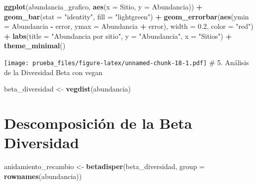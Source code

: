 \documentclass[
]{article}
\newenvironment{Shaded}{\begin{snugshade}}{\end{snugshade}}
\newcommand{\AttributeTok}[1]{\textcolor[rgb]{0.13,0.29,0.53}{#1}}
\newcommand{\FloatTok}[1]{\textcolor[rgb]{0.00,0.00,0.81}{#1}}
\newcommand{\FunctionTok}[1]{\textcolor[rgb]{0.13,0.29,0.53}{\textbf{#1}}}
\newcommand{\NormalTok}[1]{#1}
\newcommand{\OtherTok}[1]{\textcolor[rgb]{0.56,0.35,0.01}{#1}}
\newcommand{\SpecialCharTok}[1]{\textcolor[rgb]{0.81,0.36,0.00}{\textbf{#1}}}
\newcommand{\StringTok}[1]{\textcolor[rgb]{0.31,0.60,0.02}{#1}}
\begin{document}
\begin{Shaded}
\begin{Highlighting}[]
\FunctionTok{ggplot}\NormalTok{(abundancia\_grafico, }\FunctionTok{aes}\NormalTok{(}\AttributeTok{x =}\NormalTok{ Sitio, }\AttributeTok{y =}\NormalTok{ Abundancia)) }\SpecialCharTok{+}
  \FunctionTok{geom\_bar}\NormalTok{(}\AttributeTok{stat =} \StringTok{"identity"}\NormalTok{, }\AttributeTok{fill =} \StringTok{"lightgreen"}\NormalTok{) }\SpecialCharTok{+}
  \FunctionTok{geom\_errorbar}\NormalTok{(}\FunctionTok{aes}\NormalTok{(}\AttributeTok{ymin =}\NormalTok{ Abundancia }\SpecialCharTok{{-}}\NormalTok{ error, }\AttributeTok{ymax =}\NormalTok{ Abundancia }\SpecialCharTok{+}\NormalTok{ error), }\AttributeTok{width =} \FloatTok{0.2}\NormalTok{, }\AttributeTok{color =} \StringTok{"red"}\NormalTok{) }\SpecialCharTok{+}
  \FunctionTok{labs}\NormalTok{(}\AttributeTok{title =} \StringTok{"Abundancia por sitio"}\NormalTok{, }\AttributeTok{y =} \StringTok{"Abundancia"}\NormalTok{, }\AttributeTok{x =} \StringTok{"Sitios"}\NormalTok{) }\SpecialCharTok{+}
  \FunctionTok{theme\_minimal}\NormalTok{()}
\end{Highlighting}
\end{Shaded}

\texttt{[image: prueba\_files/figure-latex/unnamed-chunk-18-1.pdf]} \# 5.
Análisis de la Diversidad Beta con vegan

\begin{Shaded}
\begin{Highlighting}[]
\NormalTok{beta\_diversidad }\OtherTok{\textless{}{-}} \FunctionTok{vegdist}\NormalTok{(abundancia)}
\end{Highlighting}
\end{Shaded}

\hypertarget{descomposiciuxf3n-de-la-beta-diversidad}{%
\section{Descomposición de la Beta
Diversidad}\label{descomposiciuxf3n-de-la-beta-diversidad}}

\begin{Shaded}
\begin{Highlighting}[]
\NormalTok{anidamiento\_recambio }\OtherTok{\textless{}{-}} \FunctionTok{betadisper}\NormalTok{(beta\_diversidad, }\AttributeTok{group =} \FunctionTok{rownames}\NormalTok{(abundancia))}
\end{Highlighting}
\end{Shaded}
\end{document}
